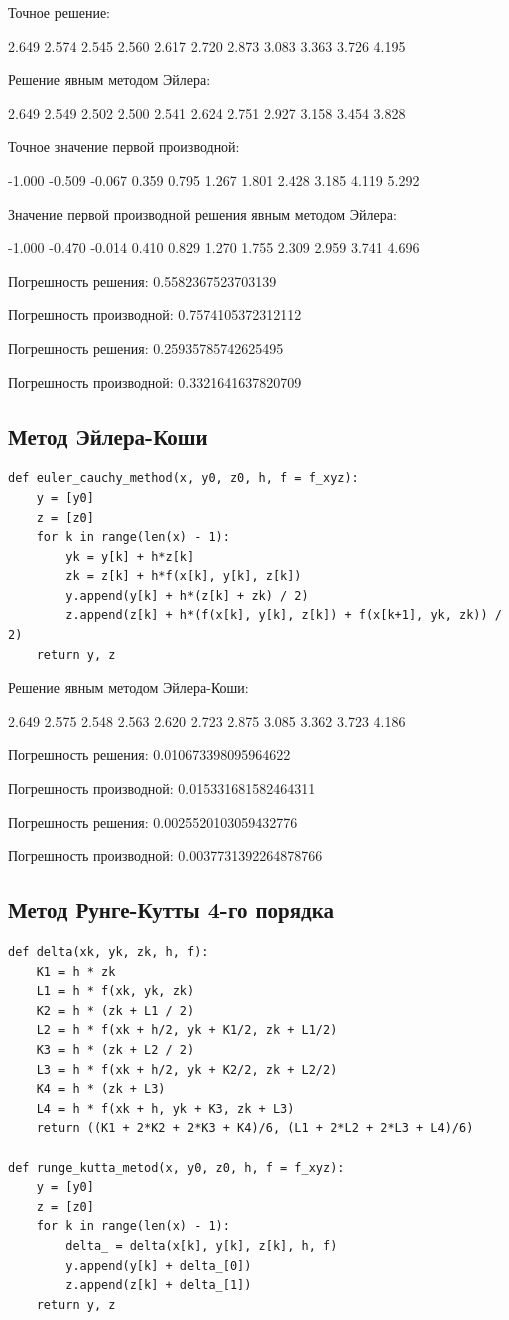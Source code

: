 \documentclass[pdf, unicode, 12pt, a4paper,oneside,fleqn]{article}
\begin{document}
Точное решение:

2.649 2.574 2.545 2.560 2.617 2.720 2.873 3.083 3.363 3.726 4.195 

Решение явным методом Эйлера:

2.649 2.549 2.502 2.500 2.541 2.624 2.751 2.927 3.158 3.454 3.828 

Точное значение первой производной:

-1.000 -0.509 -0.067 0.359 0.795 1.267 1.801 2.428 3.185 4.119 5.292 

Значение первой производной решения явным методом Эйлера:

-1.000 -0.470 -0.014 0.410 0.829 1.270 1.755 2.309 2.959 3.741 4.696 

Погрешность решения: 0.5582367523703139

Погрешность производной: 0.7574105372312112

Погрешность решения: 0.25935785742625495

Погрешность производной: 0.3321641637820709

\subsection{Метод Эйлера-Коши}

\begin{lstlisting}
def euler_cauchy_method(x, y0, z0, h, f = f_xyz):
    y = [y0]
    z = [z0]
    for k in range(len(x) - 1):
        yk = y[k] + h*z[k]
        zk = z[k] + h*f(x[k], y[k], z[k])
        y.append(y[k] + h*(z[k] + zk) / 2)
        z.append(z[k] + h*(f(x[k], y[k], z[k]) + f(x[k+1], yk, zk)) / 2)
    return y, z
\end{lstlisting}

Решение явным методом Эйлера-Коши:

2.649 2.575 2.548 2.563 2.620 2.723 2.875 3.085 3.362 3.723 4.186 

Погрешность решения: 0.010673398095964622

Погрешность производной: 0.015331681582464311

Погрешность решения: 0.0025520103059432776

Погрешность производной: 0.0037731392264878766

\subsection{Метод Рунге-Кутты 4-го порядка}

\begin{lstlisting}
def delta(xk, yk, zk, h, f):
    K1 = h * zk
    L1 = h * f(xk, yk, zk)
    K2 = h * (zk + L1 / 2)
    L2 = h * f(xk + h/2, yk + K1/2, zk + L1/2)
    K3 = h * (zk + L2 / 2)
    L3 = h * f(xk + h/2, yk + K2/2, zk + L2/2)
    K4 = h * (zk + L3)
    L4 = h * f(xk + h, yk + K3, zk + L3)
    return ((K1 + 2*K2 + 2*K3 + K4)/6, (L1 + 2*L2 + 2*L3 + L4)/6)

def runge_kutta_metod(x, y0, z0, h, f = f_xyz):
    y = [y0]
    z = [z0]
    for k in range(len(x) - 1):
        delta_ = delta(x[k], y[k], z[k], h, f)
        y.append(y[k] + delta_[0])
        z.append(z[k] + delta_[1])
    return y, z
\end{lstlisting}
\end{document}
